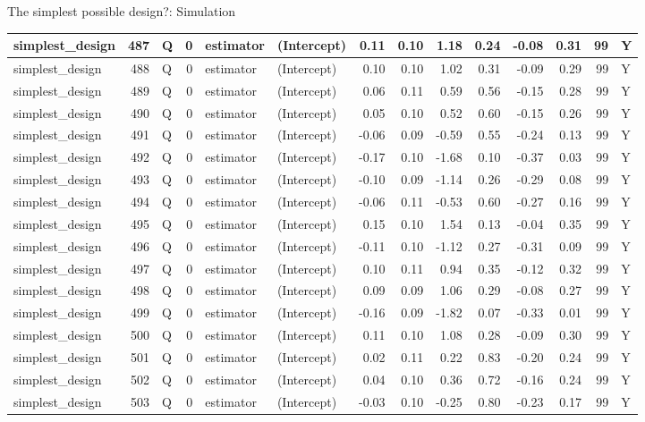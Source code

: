 \documentclass[
  11pt,
  ignorenonframetext,
]{beamer}
\begin{document}
\begin{frame}[fragile]{The simplest possible design?: Simulation}
\begin{tabular}{l|r|l|r|l|l|r|r|r|r|r|r|r|l}
\hline
simplest\_design & 487 & Q & 0 & estimator & (Intercept) & 0.11 & 0.10 & 1.18 & 0.24 & -0.08 & 0.31 & 99 & Y\\
\hline
simplest\_design & 488 & Q & 0 & estimator & (Intercept) & 0.10 & 0.10 & 1.02 & 0.31 & -0.09 & 0.29 & 99 & Y\\
\hline
simplest\_design & 489 & Q & 0 & estimator & (Intercept) & 0.06 & 0.11 & 0.59 & 0.56 & -0.15 & 0.28 & 99 & Y\\
\hline
simplest\_design & 490 & Q & 0 & estimator & (Intercept) & 0.05 & 0.10 & 0.52 & 0.60 & -0.15 & 0.26 & 99 & Y\\
\hline
simplest\_design & 491 & Q & 0 & estimator & (Intercept) & -0.06 & 0.09 & -0.59 & 0.55 & -0.24 & 0.13 & 99 & Y\\
\hline
simplest\_design & 492 & Q & 0 & estimator & (Intercept) & -0.17 & 0.10 & -1.68 & 0.10 & -0.37 & 0.03 & 99 & Y\\
\hline
simplest\_design & 493 & Q & 0 & estimator & (Intercept) & -0.10 & 0.09 & -1.14 & 0.26 & -0.29 & 0.08 & 99 & Y\\
\hline
simplest\_design & 494 & Q & 0 & estimator & (Intercept) & -0.06 & 0.11 & -0.53 & 0.60 & -0.27 & 0.16 & 99 & Y\\
\hline
simplest\_design & 495 & Q & 0 & estimator & (Intercept) & 0.15 & 0.10 & 1.54 & 0.13 & -0.04 & 0.35 & 99 & Y\\
\hline
simplest\_design & 496 & Q & 0 & estimator & (Intercept) & -0.11 & 0.10 & -1.12 & 0.27 & -0.31 & 0.09 & 99 & Y\\
\hline
simplest\_design & 497 & Q & 0 & estimator & (Intercept) & 0.10 & 0.11 & 0.94 & 0.35 & -0.12 & 0.32 & 99 & Y\\
\hline
simplest\_design & 498 & Q & 0 & estimator & (Intercept) & 0.09 & 0.09 & 1.06 & 0.29 & -0.08 & 0.27 & 99 & Y\\
\hline
simplest\_design & 499 & Q & 0 & estimator & (Intercept) & -0.16 & 0.09 & -1.82 & 0.07 & -0.33 & 0.01 & 99 & Y\\
\hline
simplest\_design & 500 & Q & 0 & estimator & (Intercept) & 0.11 & 0.10 & 1.08 & 0.28 & -0.09 & 0.30 & 99 & Y\\
\hline
simplest\_design & 501 & Q & 0 & estimator & (Intercept) & 0.02 & 0.11 & 0.22 & 0.83 & -0.20 & 0.24 & 99 & Y\\
\hline
simplest\_design & 502 & Q & 0 & estimator & (Intercept) & 0.04 & 0.10 & 0.36 & 0.72 & -0.16 & 0.24 & 99 & Y\\
\hline
simplest\_design & 503 & Q & 0 & estimator & (Intercept) & -0.03 & 0.10 & -0.25 & 0.80 & -0.23 & 0.17 & 99 & Y\\

\end{tabular}
\end{frame}
\end{document}
